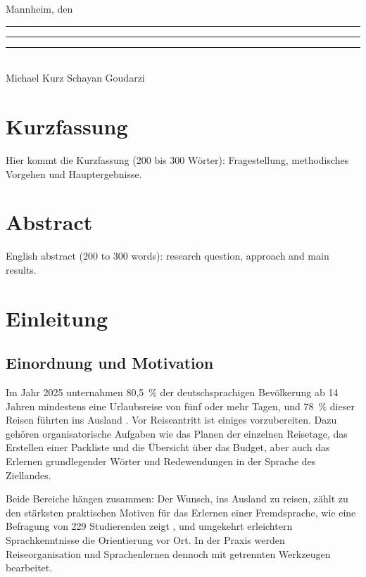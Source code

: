 \documentclass[12pt,a4paper]{scrreprt}
\begin{document}
\vspace{2cm}
\noindent Mannheim, den \rule{3cm}{0.4pt} \par
\vspace{1.5cm}
\noindent\rule{6cm}{0.4pt} \hspace{1cm} \rule{6cm}{0.4pt} \\
Michael Kurz \hspace{4.5cm} Schayan Goudarzi

\clearpage
\chapter*{Kurzfassung}
Hier kommt die Kurzfassung (200 bis 300 Wörter): Fragestellung, methodisches Vorgehen und Hauptergebnisse.

\clearpage
\chapter*{Abstract}
English abstract (200 to 300 words): research question, approach and main results.

\clearpage
\tableofcontents
\listoffigures
\listoftables
\clearpage

\chapter{Einleitung}
\section{Einordnung und Motivation}
Im Jahr 2025 unternahmen 80,5~\% der deutschsprachigen Bevölkerung ab 14 Jahren mindestens eine Urlaubsreise von fünf oder mehr Tagen, und 78~\% dieser Reisen führten ins Ausland \cite{fur2026}. Vor Reiseantritt ist einiges vorzubereiten. Dazu gehören organisatorische Aufgaben wie das Planen der einzelnen Reisetage, das Erstellen einer Packliste und die Übersicht über das Budget, aber auch das Erlernen grundlegender Wörter und Redewendungen in der Sprache des Ziellandes.

Beide Bereiche hängen zusammen: Der Wunsch, ins Ausland zu reisen, zählt zu den stärksten praktischen Motiven für das Erlernen einer Fremdsprache, wie eine Befragung von 229 Studierenden zeigt \cite{falcon2024}, und umgekehrt erleichtern Sprachkenntnisse die Orientierung vor Ort. In der Praxis werden Reiseorganisation und Sprachenlernen dennoch mit getrennten Werkzeugen bearbeitet.
\end{document}
